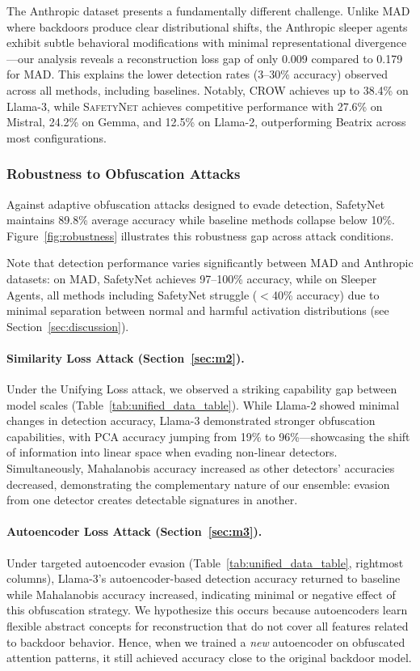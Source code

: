 The Anthropic dataset presents a fundamentally different challenge. Unlike MAD where backdoors produce clear distributional shifts, the Anthropic sleeper agents exhibit subtle behavioral modifications with minimal representational divergence—our analysis reveals a reconstruction loss gap of only 0.009 compared to 0.179 for MAD. This explains the lower detection rates (3--30\% accuracy) observed across all methods, including baselines. Notably, CROW achieves up to 38.4\% on Llama-3, while \textsc{SafetyNet} achieves competitive performance with 27.6\% on Mistral, 24.2\% on Gemma, and 12.5\% on Llama-2, outperforming Beatrix across most configurations.




\subsubsection{Robustness to Obfuscation Attacks} \label{sec:r2}

Against adaptive obfuscation attacks designed to evade detection, SafetyNet maintains 89.8\% average accuracy while baseline methods collapse below 10\%. Figure~\ref{fig:robustness} illustrates this robustness gap across attack conditions.

Note that detection performance varies significantly between MAD and Anthropic datasets: on MAD, SafetyNet achieves 97--100\% accuracy, while on Sleeper Agents, all methods including SafetyNet struggle ($<$40\% accuracy) due to minimal separation between normal and harmful activation distributions (see Section~\ref{sec:discussion}).


\paragraph{Similarity Loss Attack (Section~\ref{sec:m2}).} Under the Unifying Loss attack, we observed a striking capability gap between model scales (Table~\ref{tab:unified_data_table}). While Llama-2 showed minimal changes in detection accuracy, Llama-3 demonstrated stronger obfuscation capabilities, with PCA accuracy jumping from 19\% to 96\%---showcasing the shift of information into linear space when evading non-linear detectors. Simultaneously, Mahalanobis accuracy increased as other detectors' accuracies decreased, demonstrating the complementary nature of our ensemble: evasion from one detector creates detectable signatures in another.

\paragraph{Autoencoder Loss Attack (Section~\ref{sec:m3}).} \label{sec:r3} Under targeted autoencoder evasion (Table~\ref{tab:unified_data_table}, rightmost columns), Llama-3's autoencoder-based detection accuracy returned to baseline while Mahalanobis accuracy increased, indicating minimal or negative effect of this obfuscation strategy. We hypothesize this occurs because autoencoders learn flexible abstract concepts for reconstruction that do not cover all features related to backdoor behavior. Hence, when we trained a \textit{new} autoencoder on obfuscated attention patterns, it still achieved accuracy close to the original backdoor model.

